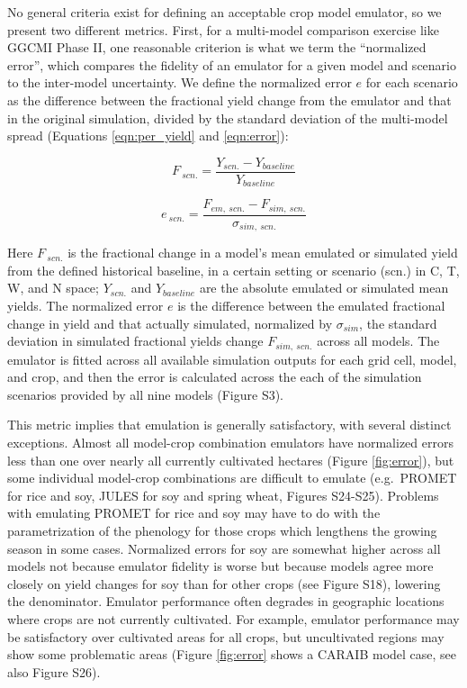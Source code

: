 \documentclass[gmd, manuscript]{copernicus} %
\begin{document}
No general criteria exist for defining an acceptable crop model emulator, so we present two different metrics. 
First, for a multi-model comparison exercise like GGCMI Phase II, one reasonable criterion is what we term the ``normalized error'', which compares the fidelity of an emulator for a given model and scenario to the inter-model uncertainty. 
We define the normalized error $e$ for each scenario as the difference between the fractional yield change from the emulator and that in the original simulation, divided by the standard deviation of the multi-model spread (Equations \ref{eqn:per_yield} and  \ref{eqn:error}):

\begin{equation}
    \label{eqn:per_yield}
    F_{\: scn.}=\frac{Y_{scn.}-Y_{baseline}}{Y_{baseline}}
\end{equation}

\begin{equation}
    \label{eqn:error}
    e_{\: scn.} =\frac{F_{em, \: scn.}-F_{sim, \: scn.}}{\sigma_{sim, \: scn.}}
\end{equation}

Here $F_{\: scn.}$ is the fractional change in a model's mean emulated or simulated yield from the defined historical baseline, in a certain setting or scenario (scn.) in C, T, W, and N space; $Y_{scn.}$ and $Y_{baseline}$ are the absolute emulated or simulated mean yields. 
The normalized error $e$ is the difference between the emulated fractional change in yield and that actually simulated, normalized by $\sigma_{sim}$, the standard deviation in simulated fractional yields change $F_{sim,\: scn.}$ across all models. 
The emulator is fitted across all available simulation outputs for each grid cell, model, and crop, and then the error is calculated across the each of the simulation scenarios provided by all nine models (Figure S3). 

This metric implies that emulation is generally satisfactory, with several distinct exceptions. 
Almost all model-crop combination emulators have normalized errors less than one over nearly all currently cultivated hectares (Figure \ref{fig:error}), but some individual model-crop combinations are difficult to emulate (e.g.\ PROMET for rice and soy, JULES for soy and spring wheat, Figures S24-S25). 
Problems with emulating PROMET for rice and soy may have to do with the parametrization of the phenology for those crops which lengthens the growing season in some cases. 
Normalized errors for soy are somewhat higher across all models not because emulator fidelity is worse but because models agree more closely on yield changes for soy than for other crops (see Figure S18), lowering the denominator. 
Emulator performance often degrades in geographic locations where crops are not currently cultivated. 
For example, emulator performance may be satisfactory over cultivated areas for all crops, but uncultivated regions may show some problematic areas (Figure \ref{fig:error} shows a CARAIB model case, see also Figure S26).
\end{document}
